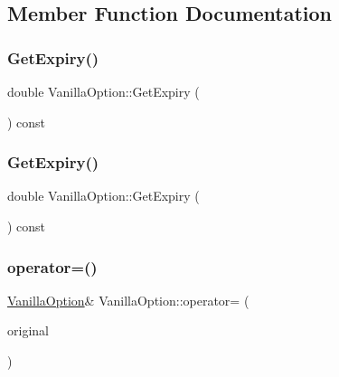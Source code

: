 \subsection{Member Function Documentation}
\hypertarget{classVanillaOption_a7118ee621b3a833a369546e249ef6778}{}\label{classVanillaOption_a7118ee621b3a833a369546e249ef6778} 
\subsubsection{\texorpdfstring{Get\+Expiry()}{GetExpiry()}\hspace{0.1cm}{\footnotesize\ttfamily [1/2]}}
{\footnotesize\ttfamily double Vanilla\+Option\+::\+Get\+Expiry (\begin{DoxyParamCaption}{ }\end{DoxyParamCaption}) const}

\hypertarget{classVanillaOption_a7118ee621b3a833a369546e249ef6778}{}\label{classVanillaOption_a7118ee621b3a833a369546e249ef6778} 
\subsubsection{\texorpdfstring{Get\+Expiry()}{GetExpiry()}\hspace{0.1cm}{\footnotesize\ttfamily [2/2]}}
{\footnotesize\ttfamily double Vanilla\+Option\+::\+Get\+Expiry (\begin{DoxyParamCaption}{ }\end{DoxyParamCaption}) const}

\hypertarget{classVanillaOption_a7b831ab1cf0ee2a0d75e3a91eee193b8}{}\label{classVanillaOption_a7b831ab1cf0ee2a0d75e3a91eee193b8} 
\subsubsection{\texorpdfstring{operator=()}{operator=()}}
{\footnotesize\ttfamily \hyperlink{classVanillaOption}{Vanilla\+Option}\& Vanilla\+Option\+::operator= (\begin{DoxyParamCaption}\item[{const \hyperlink{classVanillaOption}{Vanilla\+Option} \&}]{original }\end{DoxyParamCaption})}

